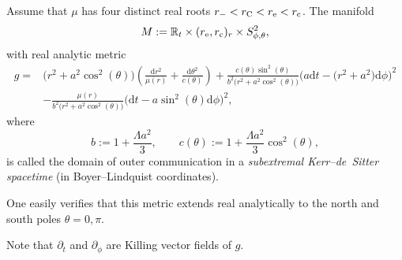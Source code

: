 \documentclass[10pt,a4paper]{amsart}
\renewcommand{\d}{\partial}
\newcommand{\md}{\mathrm d}
\newcommand{\R}[0]{\mathbb{R}}
\numberwithin{equation}{section}
\begin{document}
\begin{Definition} \label{def: BL metric}
Assume that $\mu$ has four distinct real roots $r_- < r_{\rm C} < r_{\rm e} < r_{\rm c}$. The manifold
\[
	M := \R_t \times (r_{\rm e}, r_{\rm c})_r \times S^2_{\phi, \theta},
\]
with real analytic metric
\begin{align*}
	g
		={}& \big(r^2 + a^2 \cos^2(\theta)\big)\left( \frac{\md r^2}{\mu(r)} + \frac{\md \theta^2}{c(\theta)}\right) + \frac{c(\theta)\sin^2(\theta)}{b^2\big(r^2 + a^2 \cos^2(\theta)\big)}\big(a \md t - \big(r^2 + a^2\big)\md \phi\big)^2 \\
		& - \frac{\mu(r)}{b^2\big(r^2 + a^2 \cos^2(\theta)\big)}\big(\md t - a \sin^2(\theta)\md \phi\big)^2,
\end{align*}
where
\[
	b := 1 + \frac{\Lambda a^2}3, \qquad c(\theta) := 1 + \frac{\Lambda a^2}3 \cos^2(\theta),
\]
is called the domain of outer communication in a \emph{subextremal Kerr--de~Sitter spacetime} (in Boyer--Lindquist coordinates).
\end{Definition}
One easily verifies that this metric extends real analytically to the north and south poles $\theta = 0, \pi$.

\begin{Remark}
Note that $\d_t$ and $\d_\phi$ are Killing vector fields of $g$.
\end{Remark}
\end{document}
